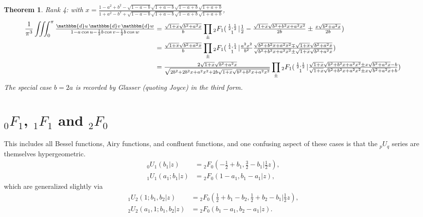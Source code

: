 \documentclass[12pt]{article}
\newcommand{\dd}[0] {\mathbbm{d}}
\numberwithin{equation}{section}
\newtheorem{theorem}{Theorem}[section]
\newcommand{\Head}[3] {{}_{#1}{#2}_{#3}}
\newcommand{\ArgS}[3] {( \begin{smallmatrix} #1 \\ #2 \end{smallmatrix} | {#3})}
\newcommand{\ArgKS}[1] {\ArgS{\frac12,\frac12}{1}{#1}}
\newcommand{\FFf}[5] {{}_{#1}{#2}_{#3} \left(#4 | {#5} \right)}
\begin{document}
\begin{theorem} Rank 4: with $x = \tfrac{1-a^2+b^2 - \sqrt{1-a-b} \sqrt{1+a-b} \sqrt{1-a+b} \sqrt{1+a+b}}{1+a^2-b^2 + \sqrt{1-a-b} \sqrt{1+a-b} \sqrt{1-a+b} \sqrt{1+a+b}}$,
\begin{align*}
\frac{1}{\pi^3} \iiint_0^{\pi} \tfrac{\dd u \, \dd v \, \dd w} {1 - a \cos u - \frac12 b \cos v - \frac12 b \cos w} &= \tfrac{\sqrt{1+x}\sqrt{b^2+a^2 x}}{b} \prod_{\pm} \Head{2}{F}{1} \ArgKS{\tfrac{1}{2}-\tfrac{\sqrt{1+x}\sqrt{b^2+b^2 x + a^2 x^2}}{2b} \pm \tfrac{x\sqrt{b^2+a^2 x}}{2b}}\\
&= \tfrac{\sqrt{1+x}\sqrt{b^2+a^2 x}}{b} \prod_{\pm} \Head{2}{F}{1} \ArgS{\frac14,\frac14}{1}{\tfrac{a^2 x^2}{b^2}\tfrac{\sqrt{b^2+b^2 x + a^2 x^2} \mp \sqrt{1+x}\sqrt{b^2+a^2 x}}{\sqrt{b^2+b^2 x + a^2 x^2} \pm \sqrt{1+x}\sqrt{b^2+a^2 x}}}\\
&=\tfrac{2\sqrt{1+x}\sqrt{b^2+a^2 x}}{\sqrt{2b^2 + 2b^2 x + a^2 x^2 + 2b \sqrt{1+x}\sqrt{b^2+b^2 x + a^2 x^2}}} \prod_{\pm} \Head{2}{F}{1} \ArgKS{\tfrac{\sqrt{1+x}\sqrt{b^2+b^2 x+a^2 x^2} \pm x \sqrt{b^2+ a^2 x}-b}{\sqrt{1+x}\sqrt{b^2+b^2 x+a^2 x^2} \pm x \sqrt{b^2+ a^2 x}+b}}
\end{align*}
The special case $b = 2a$ is recorded by Glasser (quoting Joyce) in the third form.
\end{theorem}

\section{${}_0 F_1$, ${}_1 F_1$ and ${}_2 F_0$} This includes all Bessel functions, Airy functions, and confluent functions, and one confusing aspect of these cases is that the ${}_p U_{q}$ series are themselves hypergeometric.
\begin{align*}
\FFf{0}{U}{1}{b_1}{z} &= \FFf{2}{F}{0}{-\tfrac{1}{2}+b_1, \tfrac{3}{2}-b_1}{\tfrac{1}{2}z}\text{,}\\
\FFf{1}{U}{1}{a_1;b_1}{z} &= \FFf{2}{F}{0}{1-a_1, b_1-a_1}{z}\text{,}
\end{align*}
which are generalized slightly via
\begin{equation}
\label{equ_pUq_as_hyp}
\begin{alignedat}{5}
\FFf{1}{U}{2}{1;b_1,b_2}{z} &= \FFf{2}{F}{0}{\tfrac{1}{2}+b_1-b_2, \tfrac{1}{2}+b_2-b_1}{\tfrac{1}{2}z}\text{,}\\
\FFf{2}{U}{2}{a_1,1;b_1,b_2}{z} &= \FFf{2}{F}{0}{b_1-a_1, b_2-a_1}{z}\text{.}
\end{alignedat}
\end{equation}
\end{document}
